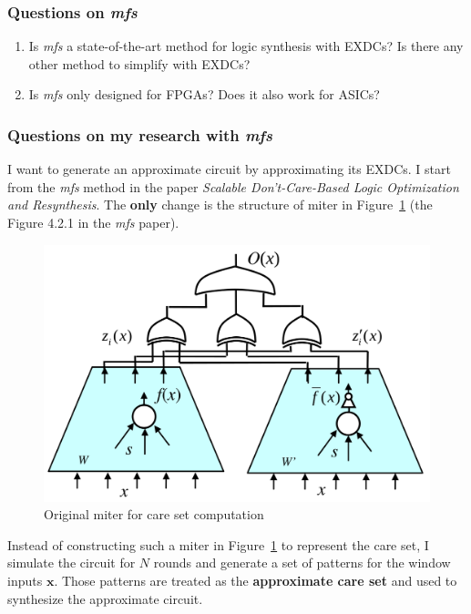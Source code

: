 \documentclass{rpt}
\begin{document}
\subsubsection*{Questions on \textit{mfs}}

\begin{enumerate}
\item Is \textit{mfs} a state-of-the-art method for logic synthesis with EXDCs?
Is there any other method to simplify with EXDCs?
\item Is \textit{mfs} only designed for FPGAs? Does it also work for ASICs?
\end{enumerate}

\subsubsection*{Questions on my research with \textit{mfs}}

I want to generate an approximate circuit by approximating its EXDCs.
I start from the \textit{mfs} method in the paper \textit{Scalable Don't-Care-Based Logic Optimization and Resynthesis}.
The {\bf only} change is the structure of miter in Figure~\ref{fig:ori} (the Figure 4.2.1 in the \textit{mfs} paper).

\begin{figure}[!htbp]
\centering
\includegraphics[scale = 0.2]{./sat.png}
\caption{Original miter for care set computation}\label{fig:ori}
\end{figure}

Instead of constructing such a miter in Figure~\ref{fig:ori} to represent the care set,
I simulate the circuit for $N$ rounds and generate a set of patterns for the window inputs $\mathbf{x}$.
Those patterns are treated as the {\bf approximate care set} and used to synthesize the approximate circuit.
\end{document}
